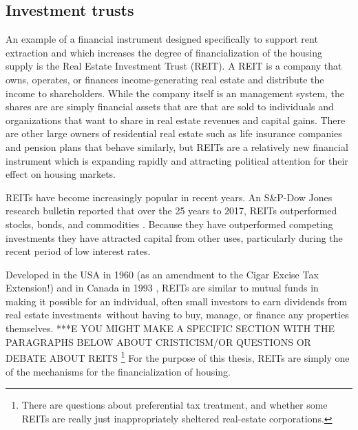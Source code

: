 \subsection{Investment trusts}
An example of a financial instrument designed specifically to support rent extraction and which  increases the degree of financialization of the housing supply is the  Real Estate Investment Trust (REIT).  A REIT is a company that owns, operates, or finances income-generating real estate and distribute the income to shareholders. While the company itself is an management system, the shares are are simply financial assets that are that are sold to individuals and organizations that want to share in real estate revenues and capital gains. There are other large owners of residential real estate such as life insurance companies and pension plans that behave similarly, but REITs are a relatively new financial instrument which is  expanding rapidly and attracting political attention for their effect on housing markets.  %

REITs have become increasingly popular in recent years.  An S\&P-Dow Jones research bulletin reported that over the  25 years to 2017, REITs outperformed stocks, bonds, and commodities \cite{GET-Dow-Jones-research-bulletin}. %
Because they have outperformed competing investments they have attracted  capital from other uses, particularly during the recent period of low interest rates.

Developed in the USA  in 1960 (as an amendment to the Cigar Excise Tax Extension!) and in Canada in 1993 \cite{GET_REITsDevelopedDates}, REITs are similar to mutual funds in making it possible for an individual, often small investors to earn dividends from real estate investments without having to buy, manage, or finance any properties themselves. 
***E YOU MIGHT MAKE A SPECIFIC SECTION WITH THE PARAGRAPHS BELOW ABOUT CRISTICISM/OR QUESTIONS OR DEBATE ABOUT REITS %
\footnote{There are questions about preferential tax treatment, and whether some REITs are really just inappropriately sheltered real-estate corporations. } For the purpose of this thesis, REITs are simply one of the mechanisms for the financialization of housing.

